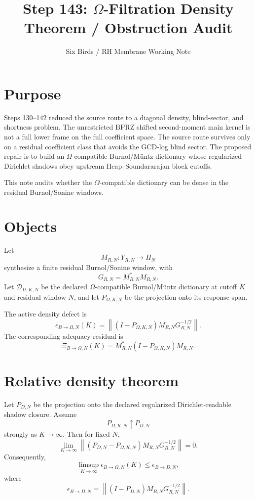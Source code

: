 \documentclass[11pt]{article}
\title{Step 143: $\Omega$-Filtration Density Theorem / Obstruction Audit}
\author{Six Birds / RH Membrane Working Note}
\date{}
\begin{document}
\maketitle

\section{Purpose}

Steps 130--142 reduced the source route to a diagonal density, blind-sector, and shortness problem.
The unrestricted BPRZ shifted second-moment main kernel is not a full lower frame on the full
coefficient space.  The source route survives only on a residual coefficient class that avoids the
GCD-log blind sector.  The proposed repair is to build an $\Omega$-compatible Burnol/Müntz
dictionary whose regularized Dirichlet shadows obey upstream Heap--Soundararajan block cutoffs.

This note audits whether the $\Omega$-compatible dictionary can be dense in the residual
Burnol/Sonine windows.

\section{Objects}

Let
\[
M_{R,N}:Y_{R,N}\to H_N
\]
synthesize a finite residual Burnol/Sonine window, with
\[
G_{R,N}=M_{R,N}^{*}M_{R,N}.
\]
Let $\mathcal D_{\Omega,K,N}$ be the declared $\Omega$-compatible Burnol/Müntz dictionary at
cutoff $K$ and residual window $N$, and let $P_{\Omega,K,N}$ be the projection onto its response
span.

The active density defect is
\[
\epsilon_{B\to\Omega,N}(K)
=
\left\|(I-P_{\Omega,K,N})M_{R,N}G_{R,N}^{-1/2}\right\|.
\]
The corresponding adequacy residual is
\[
\Xi_{B\to\Omega,N}(K)
=
M_{R,N}^{*}(I-P_{\Omega,K,N})M_{R,N}.
\]

\section{Relative density theorem}

Let $P_{D,N}$ be the projection onto the declared regularized Dirichlet-readable shadow closure.
Assume
\[
P_{\Omega,K,N}\uparrow P_{D,N}
\]
strongly as $K\to\infty$. Then for fixed $N$,
\[
\lim_{K\to\infty}
\left\|(P_{D,N}-P_{\Omega,K,N})M_{R,N}G_{R,N}^{-1/2}\right\|=0.
\]
Consequently,
\[
\limsup_{K\to\infty}\epsilon_{B\to\Omega,N}(K)
\le
\epsilon_{B\to D,N},
\]
where
\[
\epsilon_{B\to D,N}
=
\left\|(I-P_{D,N})M_{R,N}G_{R,N}^{-1/2}\right\|.
\]
\end{document}
